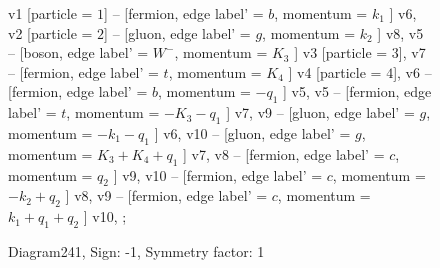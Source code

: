 \documentclass{revtex4}
\begin{document}
\begin{figure}[!htb]
\begin{center}
{    %
v1 [particle = \(1\)] -- [fermion, edge label' = \(b\), momentum = \(k_{1}\) ] v6, 
v2 [particle = \(2\)] -- [gluon, edge label' = \(g\), momentum = \(k_{2}\) ] v8, 
v5 -- [boson, edge label' = \(W^{-}\), momentum = \(K_{3}\) ] v3 [particle = \(3\)], 
v7 -- [fermion, edge label' = \(t\), momentum = \(K_{4}\) ] v4 [particle = \(4\)], 
v6 -- [fermion, edge label' = \(b\), momentum = \(-q_{1}\) ] v5, 
v5 -- [fermion, edge label' = \(t\), momentum = \(-K_{3} - q_{1}\) ] v7, 
v9 -- [gluon, edge label' = \(g\), momentum = \(-k_{1} - q_{1}\) ] v6, 
v10 -- [gluon, edge label' = \(g\), momentum = \(K_{3} + K_{4} + q_{1}\) ] v7, 
v8 -- [fermion, edge label' = \(c\), momentum = \(q_{2}\) ] v9, 
v10 -- [fermion, edge label' = \(c\), momentum = \(-k_{2} + q_{2}\) ] v8, 
v9 -- [fermion, edge label' = \(c\), momentum = \(k_{1} + q_{1} + q_{2}\) ] v10, 
};
\end{center}
\caption{Diagram241, Sign: -1, Symmetry factor: 1}
\end{figure}
\newpage
\end{document}
